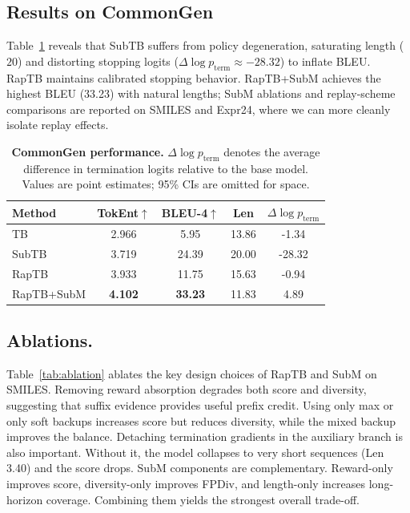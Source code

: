\documentclass{article}
\theoremstyle{plain}
\theoremstyle{definition}
\theoremstyle{remark}
\begin{document}
\subsection{Results on CommonGen}
\label{sec:results_commongen}

Table~\ref{tab:commongen_results} reveals that SubTB suffers from policy degeneration, saturating length ($20$) and distorting stopping logits ($\Delta \log p_{\text{term}} \approx -28.32$) to inflate BLEU. RapTB maintains calibrated stopping behavior. RapTB+SubM achieves the highest BLEU (33.23) with natural lengths; SubM ablations and replay-scheme comparisons are reported on SMILES and Expr24, where we can more cleanly isolate replay effects.

\begin{table}[!htbp]
\centering
\small
\setlength{\tabcolsep}{4pt}
\renewcommand{\arraystretch}{1.1}
\caption{\textbf{CommonGen performance.} $\Delta \log p_{\text{term}}$ denotes the average difference in termination logits relative to the base model. Values are point estimates; 95\% CIs are omitted for space.}
\label{tab:commongen_results}
\vspace{-0.5em}
\begin{tabular}{@{}lcccc@{}}
\toprule
Method & TokEnt$\uparrow$ & BLEU-4$\uparrow$  & Len  & $\Delta \log p_{\text{term}}$ \\
\midrule
TB & 2.966 & 5.95 & 13.86 & -1.34 \\
SubTB & 3.719 & 24.39 & 20.00 & -28.32  \\
RapTB & 3.933 & 11.75 & 15.63 & -0.94 \\
RapTB+SubM & \textbf{4.102} & \textbf{33.23} & 11.83 & 4.89  \\
\bottomrule
\end{tabular}
\end{table}



\subsection{Ablations.}
Table~\ref{tab:ablation} ablates the key design choices of RapTB and SubM on SMILES.
Removing reward absorption degrades both score and diversity, suggesting that suffix evidence provides useful prefix credit.
Using only max or only soft backups increases score but reduces diversity, while the mixed backup improves the balance.
Detaching termination gradients in the auxiliary branch is also important. Without it, the model collapses to very short sequences (Len 3.40) and the score drops.
SubM components are complementary. Reward-only improves score, diversity-only improves FPDiv, and length-only increases long-horizon coverage.
Combining them yields the strongest overall trade-off.
\end{document}
